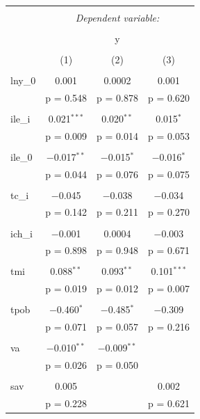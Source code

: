 \begin{table}[!htbp] \centering 
    \tiny
  \caption{} 
  \label{} 
\begin{tabular}{@{\extracolsep{5pt}}lccc} 
\\[-1.8ex]\hline 
\hline \\[-1.8ex] 
 & \multicolumn{3}{c}{\textit{Dependent variable:}} \\ 
\cline{2-4} 
\\[-1.8ex] & \multicolumn{3}{c}{y} \\ 
\\[-1.8ex] & (1) & (2) & (3)\\ 
\hline \\[-1.8ex] 
 lny\_0 & 0.001 & 0.0002 & 0.001 \\ 
  & p = 0.548 & p = 0.878 & p = 0.620 \\ 
  & & & \\ 
 ile\_i & 0.021$^{***}$ & 0.020$^{**}$ & 0.015$^{*}$ \\ 
  & p = 0.009 & p = 0.014 & p = 0.053 \\ 
  & & & \\ 
 ile\_0 & $-$0.017$^{**}$ & $-$0.015$^{*}$ & $-$0.016$^{*}$ \\ 
  & p = 0.044 & p = 0.076 & p = 0.075 \\ 
  & & & \\ 
 tc\_i & $-$0.045 & $-$0.038 & $-$0.034 \\ 
  & p = 0.142 & p = 0.211 & p = 0.270 \\ 
  & & & \\ 
 ich\_i & $-$0.001 & 0.0004 & $-$0.003 \\ 
  & p = 0.898 & p = 0.948 & p = 0.671 \\ 
  & & & \\ 
 tmi & 0.088$^{**}$ & 0.093$^{**}$ & 0.101$^{***}$ \\ 
  & p = 0.019 & p = 0.012 & p = 0.007 \\ 
  & & & \\ 
 tpob & $-$0.460$^{*}$ & $-$0.485$^{*}$ & $-$0.309 \\ 
  & p = 0.071 & p = 0.057 & p = 0.216 \\ 
  & & & \\ 
 va & $-$0.010$^{**}$ & $-$0.009$^{**}$ &  \\ 
  & p = 0.026 & p = 0.050 &  \\ 
  & & & \\ 
 sav & 0.005 &  & 0.002 \\ 
  & p = 0.228 &  & p = 0.621 \\ 

\end{tabular}
\end{table}
